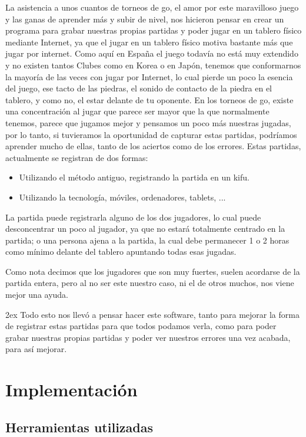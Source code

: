\documentclass[12pt,a4paper]{report}
\begin{document}
La asistencia a unos cuantos de torneos de go, el amor por este maravilloso
juego y las ganas de aprender más y subir de nivel, nos hicieron pensar en crear
un programa para grabar nuestras propias partidas y poder jugar en un tablero
físico mediante Internet, ya que el jugar en un tablero físico motiva bastante
más que jugar por internet. Como aquí en España el juego todavía no está muy
extendido y no existen tantos Clubes como en Korea o en Japón, tenemos que
conformarnos la mayoría de las veces con jugar por Internet, lo cual pierde un
poco la esencia del juego, ese tacto de las piedras, el sonido de contacto de la
piedra en el tablero, y como no, el estar delante de tu oponente. 
En los torneos de go, existe una concentración al jugar que parece ser mayor que
la que normalmente tenemos, parece que jugamos mejor y pensamos un poco más nuestras
jugadas, por lo tanto, si tuvieramos la oportunidad de capturar estas partidas,
podríamos aprender mucho de ellas, tanto de los aciertos como de los errores. 
Estas partidas, actualmente se registran de dos formas: 
\begin{itemize}
    \item Utilizando el método antiguo, registrando la partida en un kifu. 
    \item Utilizando la tecnología, móviles, ordenadores, tablets, ...
\end{itemize} 

La partida puede registrarla alguno de los dos jugadores, lo cual puede
desconcentrar un poco al jugador, ya que no estará totalmente centrado en la
partida; o una persona ajena a la partida, la cual debe permanecer 1 o 2 horas
como mínimo delante del tablero apuntando todas esas jugadas. 

Como nota decimos que los jugadores que son muy fuertes, suelen acordarse de la
partida entera, pero al no ser este nuestro caso, ni el de otros muchos, nos
viene mejor una ayuda. 

\parskip 2ex
Todo esto nos llevó a pensar hacer este software, tanto para mejorar la forma de
registrar estas partidas para que todos podamos verla, como para poder grabar
nuestras propias partidas y poder ver nuestros errores una vez acabada, para así
mejorar. 


\chapter{Implementación}

\section{Herramientas utilizadas}
\end{document}
